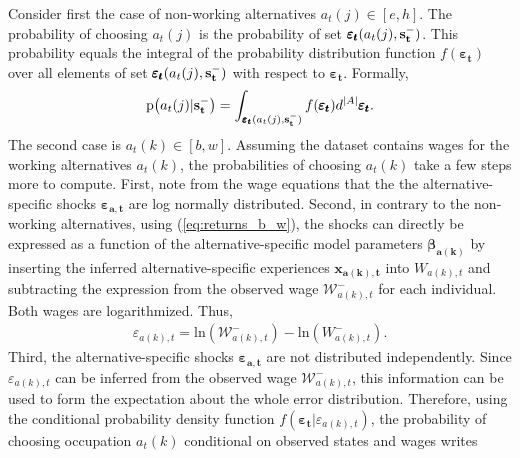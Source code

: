 \documentclass[a4paper,12pt]{article}
\begin{document}
Consider first the case of non-working alternatives $a_t(j) \in [e,h]$. The probability of choosing $a_t(j)$ is the probability of set $\pmb{\varepsilon_t}(a_t(j),\bold{s_t^-})$. This probability equals the integral of the probability distribution function $f(\pmb{\varepsilon_t})$ over all elements of set $\pmb{\varepsilon_t}(a_t(j),\bold{s_t^-})$ with respect to $\pmb{\varepsilon_t}$. Formally,
\begin{align}
\text{p}\big(a_t(j) | \bold{s_t^-}\big) = \int_{\pmb{\varepsilon_t}(a_t(j),\bold{s_t^-})} f(\pmb{\varepsilon_t}) d^{|A|} \pmb{\varepsilon_t}.
\end{align}
\noindent
The second case is $a_t(k) \in [b,w]$. Assuming the dataset contains wages for the working alternatives $a_t(k)$, the probabilities of choosing $a_t(k)$ take a few steps more to compute. First, note from the wage equations that the the alternative-specific shocks $\pmb{\varepsilon_{a,t}}$ are log normally distributed. Second, in contrary to the non-working alternatives, using (\ref{eq:returns_b_w}), the shocks can directly be expressed as a function of the alternative-specific model parameters $\pmb{\beta_{a(k)}}$ by inserting the inferred alternative-specific experiences $\pmb{x_{a(k),t}}$ into $W_{a(k),t}$ and subtracting the expression from the observed wage $\mathcal{W}^{-}_{a(k),t}$ for each individual. Both wages are logarithmized. Thus,
\begin{align} \label{eq:epsilon}
\varepsilon_{a(k),t} = \text{ln}(\mathcal{W}^{-}_{a(k),t}) - \text{ln}(W_{a(k),t}^{-}).
\end{align}
Third, the alternative-specific shocks $\pmb{\varepsilon_{a,t}}$ are not distributed independently. Since $\varepsilon_{a(k),t}$ can be inferred from the
observed wage $\mathcal{W}^{-}_{a(k),t}$, this information can be used to form the expectation about the whole error distribution. Therefore, using the conditional probability density function $f(\pmb{\varepsilon_t}|\varepsilon_{a(k),t})$, the probability of choosing occupation $a_t(k)$ conditional on observed states and wages writes
\end{document}
